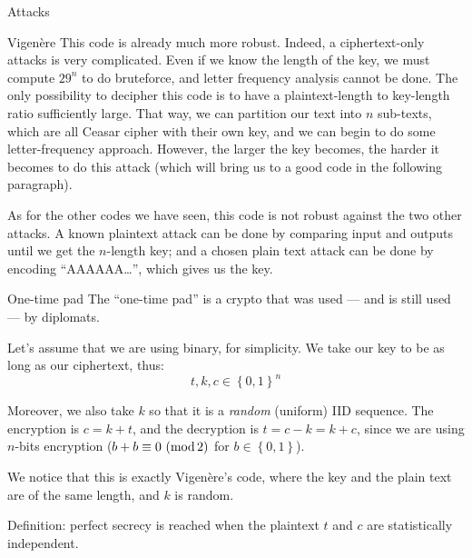 \documentclass[a4paper]{article}
\begin{document}
\begin{parag}{Attacks}
    \begin{subparag}{Vigenère}
        This code is already much more robust. Indeed, a ciphertext-only attacks is very complicated. Even if we know the length of the key, we must compute $29^n$ to do bruteforce, and letter frequency analysis cannot be done. The only possibility to decipher this code is to have a plaintext-length to key-length ratio sufficiently large. That way, we can partition our text into $n$ sub-texts, which are all Ceasar cipher with their own key, and we can begin to do some letter-frequency approach. However, the larger the key becomes, the harder it becomes to do this attack (which will bring us to a good code in the following paragraph).

        As for the other codes we have seen, this code is not robust against the two other attacks. A known plaintext attack can be done by comparing input and outputs until we get the $n$-length key; and a chosen plain text attack can be done by encoding ``AAAAAA\ldots'', which gives us the key.
    \end{subparag}
\end{parag}

\begin{parag}{One-time pad}
    The ``one-time pad'' is a crypto that was used --- and is still used --- by diplomats.

    Let's assume that we are using binary, for simplicity. We take our key to be as long as our ciphertext, thus: 
    \[t, k, c \in \left\{0, 1\right\}^{n}\]
    
    Moreover, we also take $k$ so that it is a \textit{random} (uniform) IID sequence. The encryption is $c = k + t$, and the decryption is $t = c - k = k + c$, since we are using $n$-bits encryption ($b + b \equiv 0\ (\operatorname{mod} 2)$ for $b \in \left\{0, 1\right\}$).
   
    We notice that this is exactly Vigenère's code, where the key and the plain text are of the same length, and $k$ is random.
\end{parag}

\begin{parag}{Definition: perfect secrecy}
     is reached when the plaintext $t$ and $c$ are statistically independent.
\end{parag}
\end{document}
